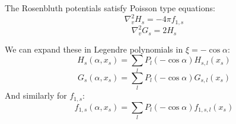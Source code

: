 \documentclass[11pt]{article}
\begin{document}
The Rosenbluth potentials satisfy Poisson type equations:
\begin{equation}
\nabla^2_v H_s = -4 \pi f_{1,s}
\end{equation}
\begin{equation}
\nabla^2_v G_s = 2 H_s
\end{equation}

We can expand these in Legendre polynomials in $\xi = -\cos \alpha$:
\begin{equation}
H_s(\alpha, x_s) = \sum_l P_l(-\cos \alpha) H_{s,l}(x_s)
\end{equation}
\begin{equation}
G_s(\alpha, x_s) = \sum_l P_l(-\cos \alpha) G_{s,l}(x_s)
\end{equation}
And similarly for $f_{1,s}$:
\begin{equation}
f_{1,s}(\alpha, x_s) = \sum_l P_l(-\cos \alpha) f_{1,s,l} (x_s)
\end{equation}
\end{document}
